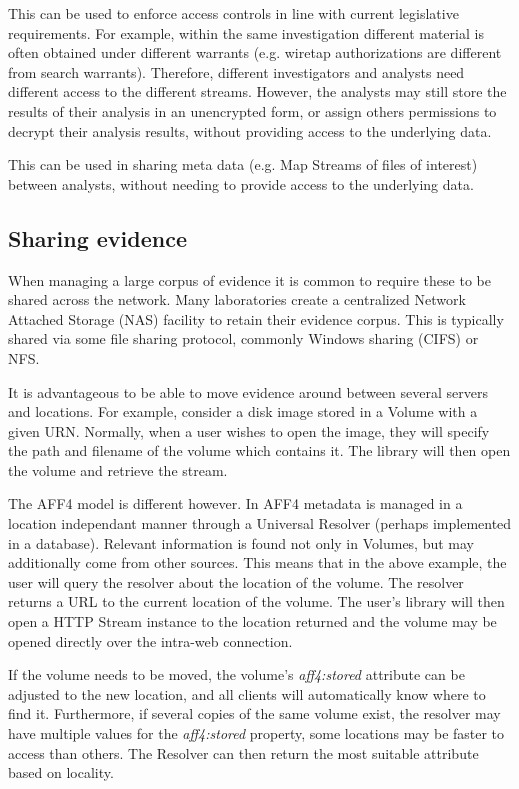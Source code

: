 \documentclass[10pt, conference]{IEEEtran}
\begin{document}
This can be used to enforce access controls in line with current
legislative requirements. For example, within the same investigation
different material is often obtained under different warrants
(e.g. wiretap authorizations are different from search
warrants). Therefore, different investigators and analysts need
different access to the different streams. However, the analysts may
still store the results of their analysis in an unencrypted form, or
assign others permissions to decrypt their analysis results, without
providing access to the underlying data. 

This can be used in sharing meta data (e.g. Map Streams of files of
interest) between analysts, without needing to provide access to the
underlying data.

\subsection{Sharing evidence}
When managing a large corpus of evidence it is common to require these
to be shared across the network. Many laboratories create a
centralized Network Attached Storage (NAS) facility to retain their
evidence corpus. This is typically shared via some file sharing
protocol, commonly Windows sharing (CIFS) or NFS.

It is advantageous to be able to move evidence around between several
servers and locations. For example, consider a disk image stored in a
Volume with a given URN. Normally, when a user wishes to open the
image, they will specify the path and filename of the volume which
contains it. The library will then open the volume and retrieve the
stream.

The AFF4 model is different however. In AFF4 metadata is managed in a location
independant manner 
through a Universal Resolver (perhaps implemented in a database). Relevant information
is found not only in Volumes, but may additionally come from other sources.
This means that in the
above example, the user will query the resolver about the location of
the volume. The resolver returns a URL to the current location of the
volume. The user's library will then open a HTTP Stream instance to
the location returned and the volume may be opened directly over the
intra-web connection.

If the volume needs to be moved, the volume's \emph{aff4:stored}
attribute can be adjusted to the new location, and all clients will
automatically know where to find it. Furthermore, if several copies of
the same volume exist, the resolver may have multiple values for the
\emph{aff4:stored} property, some locations may be faster to access than
others. The Resolver can then return the most suitable attribute based
on locality.
\end{document}

